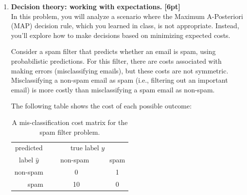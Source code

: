 \documentclass{article}
\begin{document}
\begin{enumerate}
\begin{enumerate}

\end{enumerate}

\item \textbf{Decision theory: working with expectations. [6pt]} \\
In this problem, you will analyze a scenario where the Maximum A-Posteriori (MAP) decision rule, which you learned in class, is not appropriate. Instead, you'll explore how to make decisions based on minimizing expected costs.

Consider a spam filter that predicts whether an email is spam, using probabilistic predictions. For this filter, there are costs associated with making errors (misclassifying emails), but these costs are not symmetric. Misclassifying a non-spam email as spam (i.e., filtering out an important email) is more costly than misclassifying a spam email as non-spam.

The following table shows the cost of each possible outcome:
\begin{table}[!h]
    \centering
 \begin{tabular}{|r|c|c|}\hline
  \multicolumn{1}{|c|}{predicted} & \multicolumn{2}{c|}{true label $y$}\\ \cline{2-3}
 \multicolumn{1}{|c|}{label $\hat{y}$} & \ \ \ non-spam\ \ \ \   & spam \\ \hline
 non-spam     & 0 & 1 \\ \hline
 spam     & 10 &  0 \\ \hline
 \end{tabular}
    \caption{A mis-classification cost matrix for the spam filter problem.}
    \label{tab:my_label}
\end{table}
\begin{center}
\end{center}




\end{enumerate}
\end{document}
